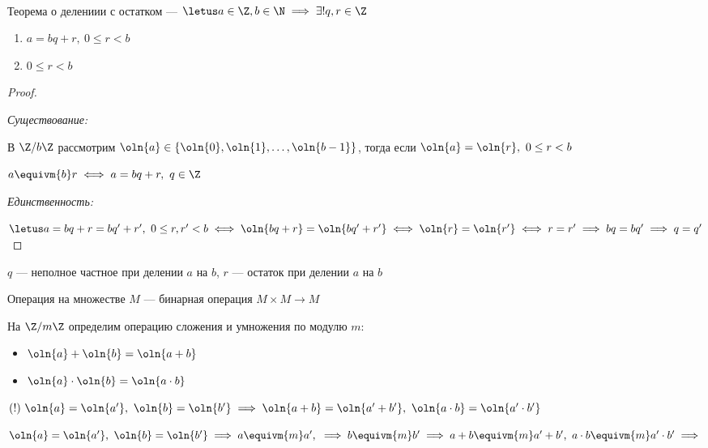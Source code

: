 \begin{follow}~

    Теорема о делениии с остатком --- $\letus a \in \Z, b \in \N \implies \exists! q, r \in \Z$
    \begin{enumerate}
        \item $a = bq + r,~0 \leq r < b$
        \item $0 \leq r < b$
    \end{enumerate}
\end{follow}

\begin{proof}~

    \textsl{Существование:}

    В $\Z/b\Z$ рассмотрим $\oln{a} \in \{\oln{0}, \oln{1}, \ldots, \oln{b-1}\}$, тогда если $\oln{a} = \oln{r},~0 \leq r < b$

    $a \equivm{b} r \iff a = bq + r,~q \in \Z$

    \textsl{Единственность:}

    $\letus a = bq + r = bq' + r',~0 \leq r, r' < b \iff \oln{bq+r} = \oln{bq'+r'} \iff \oln{r} = \oln{r'} \iff r = r' \implies bq = bq' \implies q = q'$

\end{proof}

\begin{defn}
    $q$ --- неполное частное при делении $a$ на $b$, $r$ --- остаток при делении $a$ на $b$
\end{defn}

\begin{defn}
    Операция на множестве $M$ --- бинарная операция $M \times M \to M$
\end{defn}

На $\Z/m\Z$ определим операцию сложения и умножения по модулю $m$:

\begin{itemize}
    \item $\oln{a} + \oln{b} = \oln{a + b}$
    
    \item $\oln{a} \cdot \oln{b} = \oln{a \cdot b}$
\end{itemize}

$(!)~\oln{a} = \oln{a'},~\oln{b} = \oln{b'} \implies \oln{a + b} = \oln{a' + b'},~\oln{a \cdot b} = \oln{a' \cdot b'}$

$\oln{a} = \oln{a'},~\oln{b} = \oln{b'} \implies a \equivm{m} a',~\implies b \equivm{m} b' \implies a + b \equivm{m} a' + b',~ a \cdot b \equivm{m} a' \cdot b' \implies$

